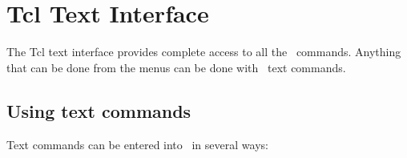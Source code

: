 %
%
%

\chapter{Tcl Text Interface}
\label{chapter:ug:text}

The Tcl text interface provides complete access to all the \VMD\ commands.
Anything that can be done from the menus can be done with \VMD\ text
commands.   

\section{Using text commands}

Text commands can be entered into \VMD\ in several ways:

